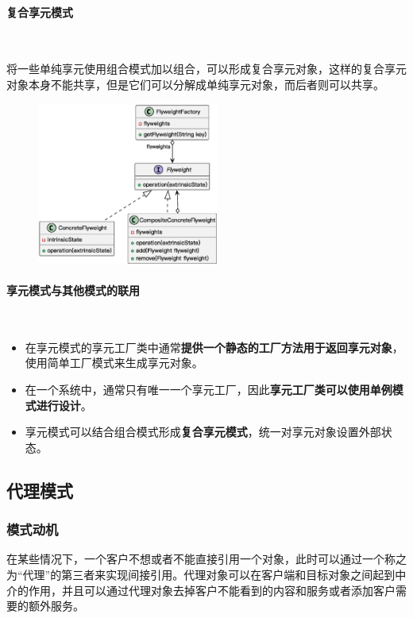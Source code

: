 \paragraph*{复合享元模式}~{} \par
将一些单纯享元使用组合模式加以组合，可以形成复合享元对象，这样的复合享元对象本身不能共享，但是它们可以分解成单纯享元对象，而后者则可以共享。
\begin{figure}[H]
    \vspace{-0.5em}
	\centering
	\includegraphics[width=0.53\textwidth]{images/享元模式拓展2.eps}
    \vspace{-1em}
\end{figure}

\paragraph*{享元模式与其他模式的联用}~{} \par
\begin{itemize}
    \item 在享元模式的享元工厂类中通常\textbf{提供一个静态的工厂方法用于返回享元对象}，使用简单工厂模式来生成享元对象。
    \item 在一个系统中，通常只有唯一一个享元工厂，因此\textbf{享元工厂类可以使用单例模式进行设计}。
    \item 享元模式可以结合组合模式形成\textbf{复合享元模式}，统一对享元对象设置外部状态。
\end{itemize}


\subsection{代理模式}

\subsubsection{模式动机}
在某些情况下，一个客户不想或者不能直接引用一个对象，此时可以通过一个称之为“代理”的第三者来实现间接引用。代理对象可以在客户端和目标对象之间起到中介的作用，并且可以通过代理对象去掉客户不能看到的内容和服务或者添加客户需要的额外服务。

